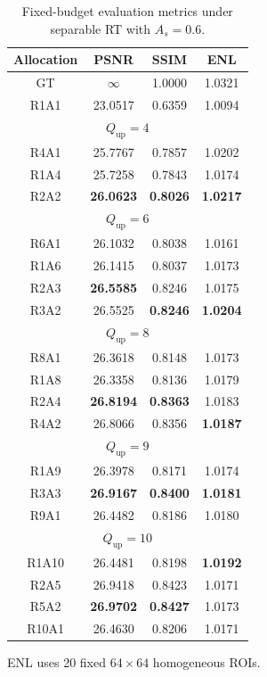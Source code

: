 \documentclass[conference]{IEEEtran}
\begin{document}
\begin{table}[t]
\caption{Fixed-budget evaluation metrics under separable RT with $A_s=0.6$.}
\label{tab:evaluation_indexes}
\centering
\scriptsize
\renewcommand{\arraystretch}{0.84}
\setlength{\tabcolsep}{8pt}
\begin{tabular}{c c c c}
\hline
Allocation & PSNR & SSIM & ENL \\
\hline
GT & $\infty$ & 1.0000 & 1.0321 \\
R1A1 & 23.0517 & 0.6359 & 1.0094 \\
\hline
\multicolumn{4}{c}{$Q_{\mathrm{up}}=4$} \\
\hline
R4A1 & 25.7767 & 0.7857 & 1.0202 \\
R1A4 & 25.7258 & 0.7843 & 1.0174 \\
R2A2 & \textbf{26.0623} & \textbf{0.8026} & \textbf{1.0217} \\
\hline
\multicolumn{4}{c}{$Q_{\mathrm{up}}=6$} \\
\hline
R6A1 & 26.1032 & 0.8038 & 1.0161 \\
R1A6 & 26.1415 & 0.8037 & 1.0173 \\
R2A3 & \textbf{26.5585} & 0.8246 & 1.0175 \\
R3A2 & 26.5525 & \textbf{0.8246} & \textbf{1.0204} \\
\hline
\multicolumn{4}{c}{$Q_{\mathrm{up}}=8$} \\
\hline
R8A1 & 26.3618 & 0.8148 & 1.0173 \\
R1A8 & 26.3358 & 0.8136 & 1.0179 \\
R2A4 & \textbf{26.8194} & \textbf{0.8363} & 1.0183 \\
R4A2 & 26.8066 & 0.8356 & \textbf{1.0187} \\
\hline
\multicolumn{4}{c}{$Q_{\mathrm{up}}=9$} \\
\hline
R1A9 & 26.3978 & 0.8171 & 1.0174 \\
R3A3 & \textbf{26.9167} & \textbf{0.8400} & \textbf{1.0181} \\
R9A1 & 26.4482 & 0.8186 & 1.0180 \\
\hline
\multicolumn{4}{c}{$Q_{\mathrm{up}}=10$} \\
\hline
R1A10 & 26.4481 & 0.8198 & \textbf{1.0192} \\
R2A5 & 26.9418 & 0.8423 & 1.0171 \\
R5A2 & \textbf{26.9702} & \textbf{0.8427} & 1.0173 \\
R10A1 & 26.4630 & 0.8206 & 1.0171 \\
\hline
\end{tabular}
\vspace{2pt}

\parbox{0.96\linewidth}{\footnotesize   ENL uses 20 fixed $64\times64$ homogeneous ROIs.}
\end{table}
\end{document}
